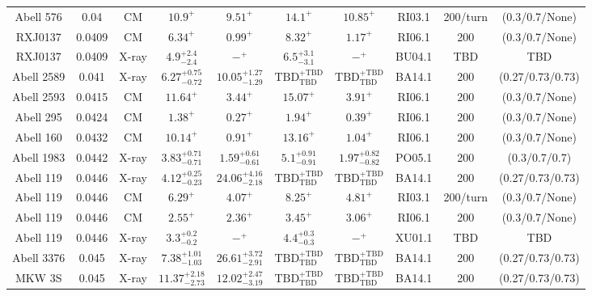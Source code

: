 \begin{table}
\begin{tabular}{cccccccccc}
Abell 576 & 0.04 & CM & ${10.9}^{+}_{}$ & ${9.51}^{+}_{}$ & ${14.1}^{+}_{}$ & ${10.85}^{+}_{}$ & RI03.1 & 200/turn & (0.3/0.7/None) \\
RXJ0137 & 0.0409 & CM & ${6.34}^{+}_{}$ & ${0.99}^{+}_{}$ & ${8.32}^{+}_{}$ & ${1.17}^{+}_{}$ & RI06.1 & 200 & (0.3/0.7/None) \\
RXJ0137 & 0.0409 & X-ray & ${4.9}^{+2.4}_{-2.4}$ & ${-}^{+}_{}$ & ${6.5}^{+3.1}_{-3.1}$ & ${-}^{+}_{}$ & BU04.1 & TBD & TBD \\
Abell 2589 & 0.041 & X-ray & ${6.27}^{+0.75}_{-0.72}$ & ${10.05}^{+1.27}_{-1.29}$ & ${\mathrm{TBD}}^{+\mathrm{TBD}}_{\mathrm{TBD}}$ & ${\mathrm{TBD}}^{+\mathrm{TBD}}_{\mathrm{TBD}}$ & BA14.1 & 200 & (0.27/0.73/0.73) \\
Abell 2593 & 0.0415 & CM & ${11.64}^{+}_{}$ & ${3.44}^{+}_{}$ & ${15.07}^{+}_{}$ & ${3.91}^{+}_{}$ & RI06.1 & 200 & (0.3/0.7/None) \\
Abell 295 & 0.0424 & CM & ${1.38}^{+}_{}$ & ${0.27}^{+}_{}$ & ${1.94}^{+}_{}$ & ${0.39}^{+}_{}$ & RI06.1 & 200 & (0.3/0.7/None) \\
Abell 160 & 0.0432 & CM & ${10.14}^{+}_{}$ & ${0.91}^{+}_{}$ & ${13.16}^{+}_{}$ & ${1.04}^{+}_{}$ & RI06.1 & 200 & (0.3/0.7/None) \\
Abell 1983 & 0.0442 & X-ray & ${3.83}^{+0.71}_{-0.71}$ & ${1.59}^{+0.61}_{-0.61}$ & ${5.1}^{+0.91}_{-0.91}$ & ${1.97}^{+0.82}_{-0.82}$ & PO05.1 & 200 & (0.3/0.7/0.7) \\
Abell 119 & 0.0446 & X-ray & ${4.12}^{+0.25}_{-0.23}$ & ${24.06}^{+4.16}_{-2.18}$ & ${\mathrm{TBD}}^{+\mathrm{TBD}}_{\mathrm{TBD}}$ & ${\mathrm{TBD}}^{+\mathrm{TBD}}_{\mathrm{TBD}}$ & BA14.1 & 200 & (0.27/0.73/0.73) \\
Abell 119 & 0.0446 & CM & ${6.29}^{+}_{}$ & ${4.07}^{+}_{}$ & ${8.25}^{+}_{}$ & ${4.81}^{+}_{}$ & RI03.1 & 200/turn & (0.3/0.7/None) \\
Abell 119 & 0.0446 & CM & ${2.55}^{+}_{}$ & ${2.36}^{+}_{}$ & ${3.45}^{+}_{}$ & ${3.06}^{+}_{}$ & RI06.1 & 200 & (0.3/0.7/None) \\
Abell 119 & 0.0446 & X-ray & ${3.3}^{+0.2}_{-0.2}$ & ${-}^{+}_{}$ & ${4.4}^{+0.3}_{-0.3}$ & ${-}^{+}_{}$ & XU01.1 & TBD & TBD \\
Abell 3376 & 0.045 & X-ray & ${7.38}^{+1.01}_{-1.03}$ & ${26.61}^{+3.72}_{-2.91}$ & ${\mathrm{TBD}}^{+\mathrm{TBD}}_{\mathrm{TBD}}$ & ${\mathrm{TBD}}^{+\mathrm{TBD}}_{\mathrm{TBD}}$ & BA14.1 & 200 & (0.27/0.73/0.73) \\
MKW 3S & 0.045 & X-ray & ${11.37}^{+2.18}_{-2.73}$ & ${12.02}^{+2.47}_{-3.19}$ & ${\mathrm{TBD}}^{+\mathrm{TBD}}_{\mathrm{TBD}}$ & ${\mathrm{TBD}}^{+\mathrm{TBD}}_{\mathrm{TBD}}$ & BA14.1 & 200 & (0.27/0.73/0.73) \\

\end{tabular}
\end{table}
